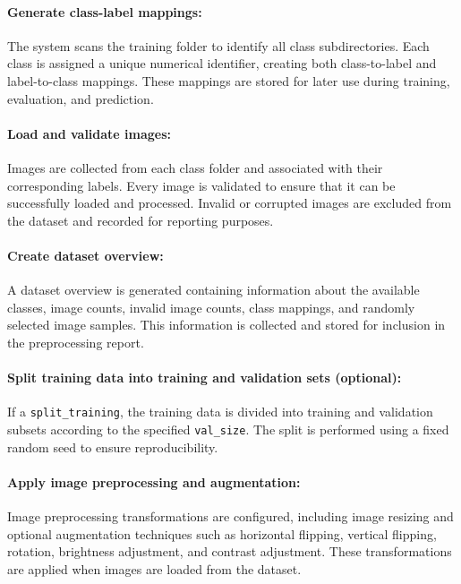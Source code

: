 \vspace{1cm}
\paragraph{Generate class-label mappings:}\par
The system scans the training folder to identify all class subdirectories. Each class is assigned a unique numerical identifier, creating both class-to-label and label-to-class mappings. These mappings are stored for later use during training, evaluation, and prediction.

\vspace{1cm}
\paragraph{Load and validate images:}\par
Images are collected from each class folder and associated with their corresponding labels. Every image is validated to ensure that it can be successfully loaded and processed. Invalid or corrupted images are excluded from the dataset and recorded for reporting purposes.

\vspace{1cm}
\paragraph{Create dataset overview:}\par
A dataset overview is generated containing information about the available classes, image counts, invalid image counts, class mappings, and randomly selected image samples. This information is collected and stored for inclusion in the preprocessing report.
\vspace{1cm}
\paragraph{Split training data into training and validation sets (optional):}\par
If a \texttt{split\_training}, the training data is divided into training and validation subsets according to the specified \texttt{val\_size}. The split is performed using a fixed random seed to ensure reproducibility.

\vspace{1cm}
\paragraph{Apply image preprocessing and augmentation:}\par
Image preprocessing transformations are configured, including image resizing and optional augmentation techniques such as horizontal flipping, vertical flipping, rotation, brightness adjustment, and contrast adjustment. These transformations are applied when images are loaded from the dataset.

